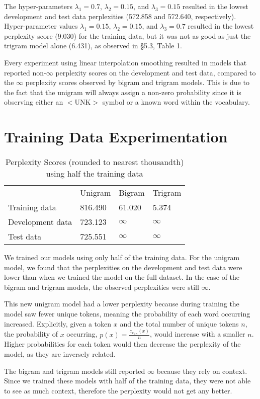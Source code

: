 \documentclass[12pt,notitlepage]{article}
\begin{document}
\par The hyper-parameters $\lambda_{1}=0.7$, $\lambda_{2}=0.15$, and $\lambda_{3}=0.15$ resulted in the lowest development and test data perplexities (572.858 and 572.640, respectively). Hyper-parameter values $\lambda_{1}=0.15$, $\lambda_{2}=0.15$, and $\lambda_{3}=0.7$ resulted in the lowest perplexity score (9.030) for the training data, but it was not as good as just the trigram model alone (6.431), as observed in §5.3, Table 1.  
\par Every experiment using linear interpolation smoothing resulted in models that reported non-$\infty$ perplexity scores on the development and test data, compared to the $\infty$ perplexity scores observed by bigram and trigram models. This is due to the fact that the unigram will always assign a non-zero probability since it is observing either an $<$UNK$>$ symbol or a known word within the vocabulary.

\section{Training Data Experimentation}
\begin{table}[H]
	\centering
	\caption{Perplexity Scores (rounded to nearest thousandth) using half the training data}
	\begin{tabular}{llll}
		& Unigram & Bigram & Trigram \\
		\cline{2-4} 
		\multicolumn{1}{l|}{Training data} & \multicolumn{1}{l|}{816.490} & \multicolumn{1}{l|}{61.020} & \multicolumn{1}{l|}{5.374} \\
		\cline{2-4} 
		\multicolumn{1}{l|}{Development data} & \multicolumn{1}{l|}{723.123} & \multicolumn{1}{l|}{$\infty$} & \multicolumn{1}{l|}{$\infty$} \\
		\cline{2-4} 
		\multicolumn{1}{l|}{Test data} & \multicolumn{1}{l|}{725.551} & \multicolumn{1}{l|}{$\infty$} & \multicolumn{1}{l|}{$\infty$} \\
		\cline{2-4} 
	\end{tabular}
\end{table}
\tab We trained our models using only half of the training data. For the unigram model, we found that the perplexities on the development and test data were lower than when we trained the model on the full dataset. In the case of the bigram and trigram models, the observed perplexities were still $\infty$. 
\par This new unigram model had a lower perplexity because during training the model saw fewer unique tokens, meaning the probability of each word occurring increased. Explicitly, given a token $x$ and the total number of unique tokens $n$, the probability of $x$ occurring, $p(x) = \frac{c_{x_{1:n}}(x)}{n}$, would increase with a smaller $n$. Higher probabilities for each token would then decrease the perplexity of the model, as they are inversely related.
\par The bigram and trigram models still reported $\infty$ because they rely on context. Since we trained these models with half of the training data, they were not able to see as much context, therefore the perplexity would not get any better.
\end{document}
